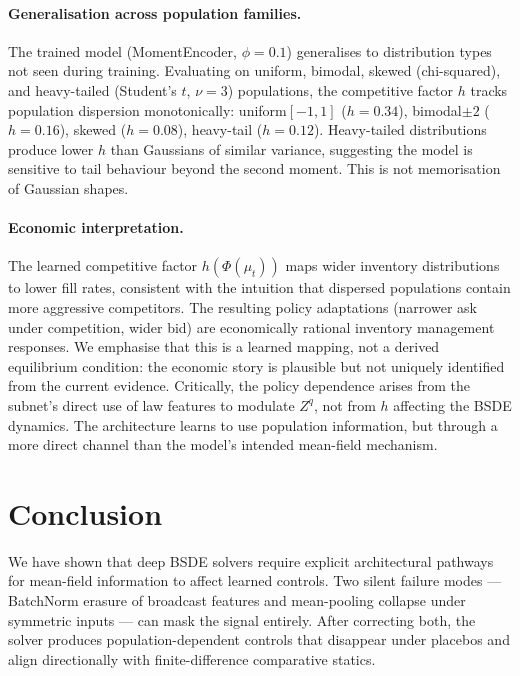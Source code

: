 \documentclass[11pt,a4paper]{article}
\newcommand{\mup}{\mu_t}
\begin{document}
\paragraph{Generalisation across population families.}
The trained model (MomentEncoder, $\phi = 0.1$) generalises to distribution types not seen during training. Evaluating on uniform, bimodal, skewed (chi-squared), and heavy-tailed (Student's $t$, $\nu=3$) populations, the competitive factor $h$ tracks population dispersion monotonically: uniform$[-1,1]$ ($h = 0.34$), bimodal$\pm 2$ ($h = 0.16$), skewed ($h = 0.08$), heavy-tail ($h = 0.12$). Heavy-tailed distributions produce lower $h$ than Gaussians of similar variance, suggesting the model is sensitive to tail behaviour beyond the second moment. This is not memorisation of Gaussian shapes.

\paragraph{Economic interpretation.}
The learned competitive factor $h(\Phi(\mup))$ maps wider inventory distributions to lower fill rates, consistent with the intuition that dispersed populations contain more aggressive competitors. The resulting policy adaptations (narrower ask under competition, wider bid) are economically rational inventory management responses. We emphasise that this is a learned mapping, not a derived equilibrium condition: the economic story is plausible but not uniquely identified from the current evidence. Critically, the policy dependence arises from the subnet's direct use of law features to modulate $Z^q$, not from $h$ affecting the BSDE dynamics. The architecture learns to use population information, but through a more direct channel than the model's intended mean-field mechanism.

\section{Conclusion}
\label{sec:conclusion}

We have shown that deep BSDE solvers require explicit architectural pathways for mean-field information to affect learned controls. Two silent failure modes --- BatchNorm erasure of broadcast features and mean-pooling collapse under symmetric inputs --- can mask the signal entirely. After correcting both, the solver produces population-dependent controls that disappear under placebos and align directionally with finite-difference comparative statics.
\end{document}
